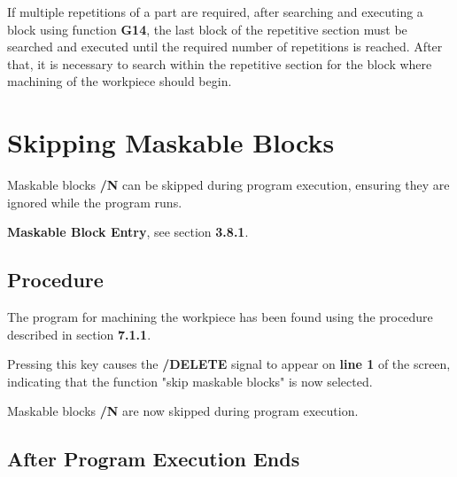 If multiple repetitions of a part are required, after searching and executing a block using function \textbf{G14}, the last block of the repetitive section must be searched and executed until the required number of repetitions is reached.  
After that, it is necessary to search within the repetitive section for the block where machining of the workpiece should begin.

\section{Skipping Maskable Blocks}

Maskable blocks \textbf{/N} can be skipped during program execution, ensuring they are ignored while the program runs.

\textbf{Maskable Block Entry}, see section \textbf{3.8.1}.

\subsection{Procedure}

The program for machining the workpiece has been found using the procedure described in section \textbf{7.1.1}.

\begin{itemize}
\end{itemize}
\vspace{.5cm}
\begin{itemize}
\end{itemize}

Pressing this key causes the \textbf{/DELETE} signal to appear on \textbf{line 1} of the screen, indicating that the function "skip maskable blocks" is now selected.

\begin{itemize}
\end{itemize}

Maskable blocks \textbf{/N} are now skipped during program execution.

\subsection{After Program Execution Ends}

\begin{itemize}
\end{itemize}

